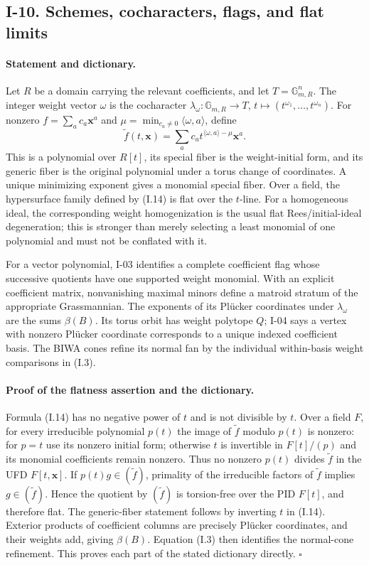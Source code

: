 \subsection{I-10. Schemes, cocharacters, flags, and flat limits}
\label{I-10}

\paragraph{Statement and dictionary.}
Let $R$ be a domain carrying the relevant coefficients, and let
$T=\mathbb G_{m,R}^{n}$.  The integer weight vector $\omega$
is the cocharacter
$\lambda_\omega:\mathbb G_{m,R}\to T$,
$t\mapsto(t^{\omega_1},\ldots,t^{\omega_n})$.
For nonzero $f=\sum_a c_a\mathbf x^a$ and
$\mu=\min_{c_a\ne0}\langle\omega,a\rangle$, define
\[
 \widetilde f(t,\mathbf x)=
 \sum_a c_a t^{\langle\omega,a\rangle-\mu}\mathbf x^a.
\tag{I.14}
\]
This is a polynomial over $R[t]$, its special fiber is the
weight-initial form, and its generic fiber is the original
polynomial under a torus change of coordinates.  A unique
minimizing exponent gives a monomial special fiber.  Over a field,
the hypersurface family defined by (I.14) is flat over the
$t$-line.  For a homogeneous ideal, the corresponding weight
homogenization is the usual flat Rees/initial-ideal degeneration;
this is stronger than merely selecting a least monomial of one
polynomial and must not be conflated with it.

For a vector polynomial, I-03 identifies a complete coefficient
flag whose successive quotients have one supported weight
monomial.  With an explicit coefficient matrix, nonvanishing
maximal minors define a matroid stratum of the appropriate
Grassmannian.  The exponents of its Pl\"ucker coordinates under
$\lambda_\omega$ are the sums $\beta(B)$.  Its torus orbit has
weight polytope $Q$; I-04 says a vertex with nonzero Pl\"ucker
coordinate corresponds to a unique indexed coefficient basis.
The BIWA cones refine its normal fan by the individual
within-basis weight comparisons in (I.3).

\paragraph{Proof of the flatness assertion and the dictionary.}
Formula (I.14) has no negative power of $t$ and is not divisible
by $t$.  Over a field $F$, for every irreducible polynomial
$p(t)$ the image of $\widetilde f$ modulo $p(t)$ is nonzero:
for $p=t$ use its nonzero initial form; otherwise $t$ is invertible
in $F[t]/(p)$ and its monomial coefficients remain nonzero.
Thus no nonzero $p(t)$ divides $\widetilde f$ in the UFD
$F[t,\mathbf x]$.  If $p(t)g\in(\widetilde f)$, primality of
the irreducible factors of $\widetilde f$ implies
$g\in(\widetilde f)$.  Hence the quotient by
$(\widetilde f)$ is torsion-free over the PID $F[t]$, and
therefore flat.  The generic-fiber statement follows by
inverting $t$ in (I.14).  Exterior products of coefficient
columns are precisely Pl\"ucker coordinates, and their weights
add, giving $\beta(B)$.  Equation (I.3) then identifies the
normal-cone refinement.  This proves each part of the stated
dictionary directly. \hfill$\square$

